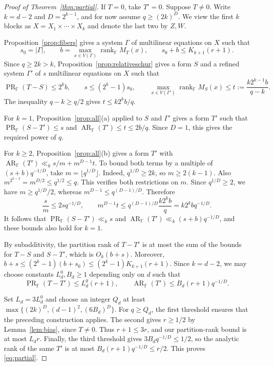 \documentclass[11pt,reqno]{amsart}
\theoremstyle{plain}
\theoremstyle{definition}
\newcommand{\F}{\mathbb F}
\DeclareMathOperator{\arank}{AR}
\DeclareMathOperator{\prank}{PR}
\DeclareMathOperator{\rk}{rank}
\begin{document}
\begin{proof}[Proof of Theorem~\ref{thm:partial}]
If $T=0$, take $T'=0$. Suppose $T\ne0$. Write $k=d-2$ and $D=2^{k-1}$, and for now assume $q\geq(2k)^D$. We view the first $k$ blocks as $X=X_1\times\cdots\times X_k$ and denote the last two by $Z,W$.

Proposition~\ref{prop:fibers} gives a system $\Gamma$ of multilinear equations on $X$ such that
\[
 s_0=|\Gamma|,\qquad b=\max_{x\in V(\Gamma)}\rk_{\F}M_T(x),\qquad s_0+b\leq K_{k+1}(r+1).
\]
Since $q\geq 2k>k$, Proposition~\ref{prop:relativeschur} gives a form $S$ and a refined system $\Gamma'$ of $s$ multilinear equations on $X$ such that
\[
 \prank_{\F}(T-S)\leq 2^k b,\qquad s\leq(2^k-1)s_0,\qquad
 \max_{x\in V(\Gamma')}\rk_{\F}M_S(x)\leq t:=\frac{k2^{k-1}b}{q-k}.
\]
The inequality $q-k\geq q/2$ gives $t\leq k2^k b/q$.

For $k=1$, Proposition~\ref{prop:all}(a) applied to $S$ and $\Gamma'$ gives a form $T'$ such that $\prank_{\F}(S-T')\leq s$ and $\arank_{\F}(T')\leq t\leq 2b/q$. Since $D=1$, this gives the required power of $q$.

For $k\geq2$, Proposition~\ref{prop:all}(b) gives a form $T'$ with $\arank_{\F}(T')\ll_k s/m+m^{D-1}t$. To bound both terms by a multiple of $(s+b)q^{-1/D}$, take $m=\lfloor q^{1/D}\rfloor$. Indeed, $q^{1/D}\geq2k$, so $m\geq2(k-1)$. Also $m^{2^{k-2}}=m^{D/2}\leq q^{1/2}\leq q$. This verifies both restrictions on $m$. Since $q^{1/D}\geq2$, we have $m\geq q^{1/D}/2$, whereas $m^{D-1}\leq q^{(D-1)/D}$. Therefore
\[
 \frac{s}{m}\leq 2s q^{-1/D},\qquad
 m^{D-1}t\leq q^{(D-1)/D}\frac{k2^k b}{q}=k2^k b q^{-1/D}.
\]
It follows that $\prank_{\F}(S-T')\ll_k s$ and $\arank_{\F}(T')\ll_k(s+b)q^{-1/D}$, and these bounds also hold for $k=1$.

By subadditivity, the partition rank of $T-T'$ is at most the sum of the bounds for $T-S$ and $S-T'$, which is $O_k(b+s)$. Moreover, $b+s\leq (2^k-1)(b+s_0)\leq (2^k-1)K_{k+1}(r+1)$. Since $k=d-2$, we may choose constants $L_d^0,B_d\geq1$ depending only on $d$ such that
\[
 \prank_{\F}(T-T')\leq L_d^0(r+1),\qquad
 \arank_{\F}(T')\leq B_d(r+1)q^{-1/D}.
\]

Set $L_d=3L_d^0$ and choose an integer $Q_d$ at least $\max\{(2k)^D,(d-1)^2,(6B_d)^D\}$. For $q\geq Q_d$, the first threshold ensures that the preceding construction applies. The second gives $r\geq1/2$ by Lemma~\ref{lem:bias}, since $T\ne0$. Thus $r+1\leq3r$, and our partition-rank bound is at most $L_dr$. Finally, the third threshold gives $3B_d q^{-1/D}\leq1/2$, so the analytic rank of the same $T'$ is at most $B_d(r+1)q^{-1/D}\leq r/2$. This proves \eqref{eq:partial}.
\end{proof}
\end{document}
